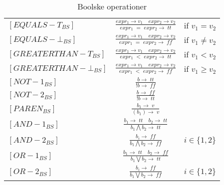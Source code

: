 \bgroup
\def\arraystretch{3}
\begin{table}[H]
\centering
\begin{tabular}{l c l}
    
    $[EQUALS-T_{BS}]$ &$\frac{expr_1 \rightarrow v_1 \quad expr_2 \rightarrow v_2}{expr_1\;=\;expr_2 \rightarrow \; tt}$ & if $v_1 = v_2$ \\
    
    $[EQUALS-\bot_{BS}]$ &$\frac{expr_1 \rightarrow v_1 \quad expr_2 \rightarrow v_2}{expr_1\;=\;expr_2 \rightarrow \; ff}$ & if $v_1 \ne v_2$ \\
    
    $[GREATERTHAN-T_{BS}]$ &$\frac{expr_1 \rightarrow v_1 \quad expr_2 \rightarrow v_2}{expr_1\;<\;expr_2 \rightarrow \; tt}$ & if $v_1 < v_2$ \\
    
    $[GREATERTHAN-\bot_{BS}]$ &$\frac{expr_1 \rightarrow v_1 \quad expr_2 \rightarrow v_2}{expr_1\;<\;expr_2 \rightarrow \; ff}$ & if $v_1 \geq v_2$ \\
    
    $[NOT-1_{BS}]$ &$\frac{b \rightarrow \; tt}{! b \rightarrow \; ff}$ & \\
    
    $[NOT-2_{BS}]$ &$\frac{b \rightarrow \; ff}{! b \rightarrow \; tt}$ & \\
    
    $[PAREN_{BS}]$ &$\frac{b_1 \rightarrow \; v}{(b_1) \rightarrow \; v}$ & \\
    
    $[AND-1_{BS}]$ &$\frac{b_1 \rightarrow \; tt \quad b_2 \rightarrow \; tt}{b_1 \bigwedge b_2 \rightarrow \; tt}$ & \\
    
    $[AND-2_{BS}]$ &$\frac{b_i \rightarrow \; ff}{b_1 \bigwedge b_2 \rightarrow \; ff}$ & $i \in \{1, 2\}$\\
    
    $[OR-1_{BS}]$ &$\frac{b_1 \rightarrow \; tt \quad b_2 \rightarrow \; ff}{b_1 \bigvee b_2 \rightarrow \; tt}$ & \\
    
    $[OR-2_{BS}]$ &$\frac{b_i \rightarrow \; ff}{b_1 \bigvee b_2 \rightarrow \; ff}$ & $i \in \{1, 2\}$\\
    
    
\end{tabular}
\caption{Boolske operationer}
\label{tab:bool}
\end{table}
\egroup